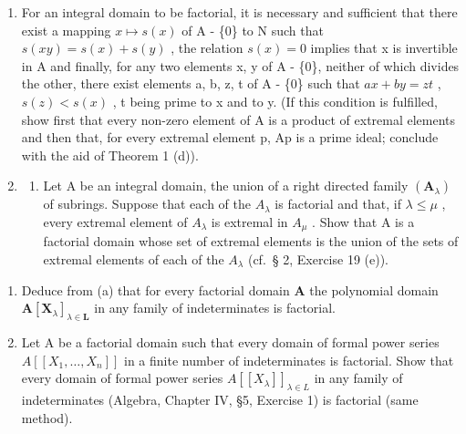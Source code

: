 
\begin{enumerate}
\def\labelenumi{\arabic{enumi}.}
\item
  For an integral domain to be factorial, it is necessary and sufficient that there exist a mapping \(x \mapsto s(x)\) of A - \{0\} to N such that \(s(xy) = s(x) + s(y)\) , the relation \(s(x) = 0\) implies that x is invertible in A and finally, for any two elements x, y of A - \{0\}, neither of which divides the other, there exist elements a, b, z, t of A - \{0\} such that \(ax + by = zt\) , \(s(z) < s(x)\) , t being prime to x and to y. (If this condition is fulfilled, show first that every non-zero element of A is a product of extremal elements and then that, for every extremal element p, Ap is a prime ideal; conclude with the aid of Theorem 1 (d)).
\item
  \begin{enumerate}
  \def\labelenumii{(\alph{enumii})}
  \tightlist
  \item
    Let A be an integral domain, the union of a right directed family \((\mathbf{A}_{\lambda})\) of subrings. Suppose that each of the \(A_{\lambda}\) is factorial and that, if \(\lambda \leqslant \mu\) , every extremal element of \(A_{\lambda}\) is extremal in \(A_{\mu}\) . Show that A is a factorial domain whose set of extremal elements is the union of the sets of extremal elements of each of the \(A_{\lambda}\) (cf.~§ 2, Exercise 19 (e)).
  \end{enumerate}
\end{enumerate}

\begin{enumerate}
\def\labelenumi{(\alph{enumi})}
\setcounter{enumi}{1}
\item
  Deduce from (a) that for every factorial domain \(\mathbf{A}\) the polynomial domain \(\mathbf{A}[\mathbf{X}_{\lambda}]_{\lambda \in \mathbf{L}}\) in any family of indeterminates is factorial.
\item
  Let A be a factorial domain such that every domain of formal power series \(A[[X_{1},\ldots,X_{n}]]\) in a finite number of indeterminates is factorial. Show that every domain of formal power series \(A[[X_{\lambda}]]_{\lambda\in L}\) in any family of indeterminates (Algebra, Chapter IV, §5, Exercise 1) is factorial (same method).
\end{enumerate}

